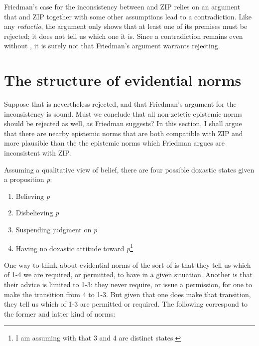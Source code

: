 \documentclass[12pt]{article}
\begin{document}
Friedman's case for the inconsistency between \ep{} and ZIP relies on an argument that \ep{} and ZIP together with some other assumptions lead to a contradiction. Like any \textit{reductio}, the argument only shows that at least one of its premises must be rejected; it does not tell us which one it is. Since a contradiction remains even without \ep{}, it is surely not \ep{} that Friedman's argument warrants rejecting.

\section{The structure of evidential norms}

Suppose that \ep{} is nevertheless rejected, and that Friedman's argument for the inconsistency is sound. Must we conclude that all non-zetetic epistemic norms should be rejected as well, as Friedman suggests? In this section, I shall argue that there are nearby epistemic norms that are both compatible with ZIP and more plausible than the the epistemic norms which Friedman argues are inconsistent with ZIP.

Assuming a qualitative view of belief, there are four possible doxastic states given a proposition \textit{p}:

\begin{enumerate}
    \item Believing \textit{p}
    \item Disbelieving \textit{p}
    \item Suspending judgment on \textit{p}
    \item Having no doxastic attitude toward \textit{p}\footnote{I am assuming with \textcite{friedman_why_2017} that 3 and 4 are distinct states.}
\end{enumerate}
%
One way to think about evidential norms of the sort of \ep{} is that they tell us which of 1-4 we are required, or permitted, to have in a given situation. Another is that their advice is limited to 1-3: they never require, or issue a permission, for one to make the transition from 4 to 1-3. But given that one does make that transition, they tell us which of 1-3 are permitted or required. The following correspond to the former and latter kind of norms:
\end{document}
